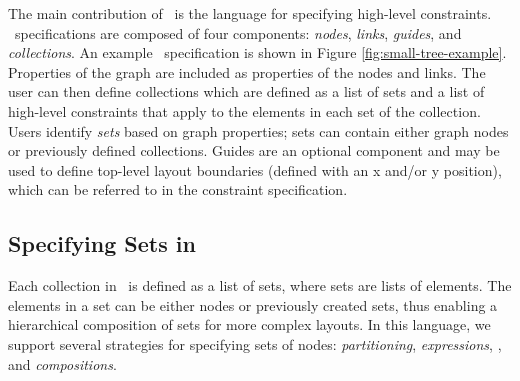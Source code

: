 \smallTreeExample

The main contribution of \projectname\ is the language for specifying
high-level constraints. \projectname\ specifications are composed of four
components: \emph{nodes}, \emph{links}, \emph{guides}, and
\emph{collections}. An example \projectname\ specification is shown in
Figure \ref{fig:small-tree-example}. Properties of the graph are included
as properties of the nodes and links. The user can then define collections
which are defined as a list of sets and a list of high-level constraints
that apply to the elements in each set of the collection. Users identify
\emph{sets} based on graph properties; sets can contain either graph nodes
or previously defined collections. Guides are an optional component and may
be used to define top-level layout boundaries (defined with an x and/or y
position), which can be referred to in the constraint specification.



\subsection{Specifying Sets in \projectname}

Each collection in \projectname\ is defined as a list of sets, where sets
are lists of elements. The elements in a set can be either nodes or
previously created sets, thus enabling a hierarchical composition of sets
for more complex layouts. In this language, we support several strategies
for specifying sets of nodes: \emph{partitioning}, \emph{expressions},
, and \emph{compositions}.

